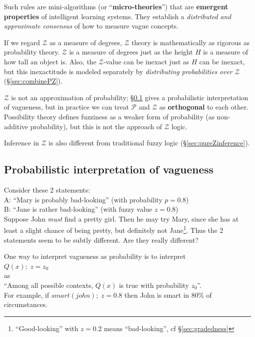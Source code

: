Such rules are mini-algorithms (or ``\textbf{micro-theories}'') that are \textbf{emergent properties} of intelligent learning systems.  They establish a \textit{distributed and approximate consensus} of how to measure vague concepts.

If we regard $\mathcal{Z}$ as a measure of degrees, $\mathcal{Z}$ theory is mathematically as rigorous as probability theory.  $\mathcal{Z}$ is a measure of degrees just as the height $H$ is a measure of how tall an object is.  Also, the $\mathcal{Z}$-value can be inexact just as $H$ can be inexact, but this inexactitude is modeled separately by \textit{distributing probabilities over $\mathcal{Z}$} (\S\ref{sec:combinePZ}).

$\mathcal{Z}$ is not an approximation of probability; \S\ref{sec:probabilistic-interpretation} gives a probabilistic interpretation of vagueness, but in practice we can treat $\mathcal{P}$ and $\mathcal{Z}$ as \textbf{orthogonal} to each other.  Possibility theory defines fuzziness as a weaker form of probability (as non-additive probability), but this is not the approach of $\mathcal{Z}$ logic.

Inference in $\mathcal{Z}$ is also different from traditional fuzzy logic (\S\ref{sec:pureZinference}).

\subsection{Probabilistic interpretation of vagueness}
\label{sec:probabilistic-interpretation}

Consider these 2 statements:\\
\hspace*{1cm} A: ``Mary is probably bad-looking''  (with probability $p = 0.8$)\\
\hspace*{1cm} B: ``Jane is rather bad-looking''  (with fuzzy value $z = 0.8$)\\
Suppose John \emph{must} find a pretty girl.  Then he may try Mary, since she has at least a slight chance of being pretty, but definitely not Jane\footnote{``Good-looking'' with $z = 0.2$ means ``bad-looking'', cf \S\ref{sec:gradedness} }.  Thus the 2 statements seem to be subtly different.  Are they really different?

One way to interpret vagueness as probability is to interpret\\
\hspace*{1cm} $Q(x); \; z=z_0$\\
as\\
\hspace*{1cm} ``Among all possible contexts, $Q(x)$ is true with probability $z_0$''.\\
For example, if $smart(john); \; z=0.8$ then John is smart in $80\%$ of circumstances.

